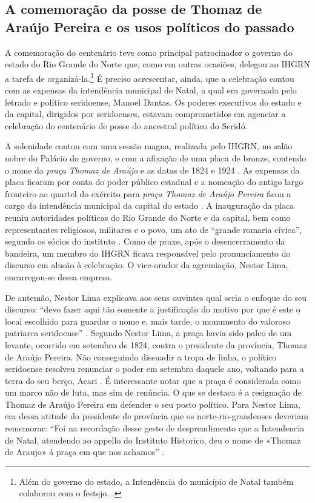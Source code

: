 \begin{refsection}
    \section{A comemoração da posse de Thomaz de Araújo Pereira e os usos políticos do passado}

    A comemoração do centenário teve como principal patrocinador o governo do estado do Rio Grande do Norte que, como em outras ocasiões, delegou ao IHGRN a tarefa de organizá-la.\footnote{Além do governo do estado, a Intendência do município de Natal também colaborou com o festejo. \cite[p.~172--173]{CentPosseTAPereira}.} É preciso acrescentar, ainda, que a celebração contou com as expensas da intendência municipal de Natal, a qual era governada pelo letrado e político seridoense, Manoel Dantas. Os poderes executivos do estado e da capital, dirigidos por seridoenses, estavam comprometidos em agenciar a celebração do centenário de posse do ancestral político do Seridó.  

    A solenidade contou com uma sessão magna, realizada pelo IHGRN, no salão nobre do Palácio do governo, e com a afixação de uma placa de bronze, contendo o nome da \textit{praça Thomaz de Araújo} e as datas de 1824 e 1924 \cite[p.~172--173]{CentPosseTAPereira}. As expensas da placa ficaram por conta do poder público estadual e a nomeação do antigo largo fronteiro ao quartel do exército para \textit{praça Thomaz de Araújo Pereira} ficou a cargo da intendência municipal da capital do estado \cite[p.~172--173]{CentPosseTAPereira}. A inauguração da placa reuniu autoridades políticas do Rio Grande do Norte e da capital, bem como representantes religiosos, militares e o povo, um ato de ``grande romaria cívica'', segundo os sócios do instituto \cite[p.~174]{CentPosseTAPereira}. Como de praxe, após o desencerramento da bandeira, um membro do IHGRN ficava responsável pelo pronunciamento do discurso em alusão à celebração. O vice-orador da agremiação, Nestor Lima, encarregou-se dessa empresa.  

    De antemão, Nestor Lima explicava aos seus ouvintes qual seria o enfoque do seu discurso: ``devo fazer aqui tão somente a justificação do motivo por que é este o local escolhido para guardar o nome e, mais tarde, o monumento do valoroso patriarca seridoense'' \cite[p.~194]{CentPosseTAPereira}. Segundo Nestor Lima, a praça havia sido palco de um levante, ocorrido em setembro de 1824, contra o presidente da província, Thomaz de Araújo Pereira. Não conseguindo dissuadir a tropa de linha, o político seridoense resolveu renunciar o poder em setembro daquele ano, voltando para a terra do seu berço, Acari \cite[p.~194]{CentPosseTAPereira}. É interessante notar que a praça é considerada como um marco não de luta, mas sim de renúncia. O que se destaca é a resignação de Thomaz de Araújo Pereira em defender o seu posto político. Para Nestor Lima, era dessa atitude do presidente de província que os norte-rio-grandenses deveriam rememorar: ``Foi na recordação desse gesto de desprendimento que a Intendencia de Natal, atendendo ao appello do Instituto Historico, deu o nome de «Thomaz de Araujo» á praça em que nos achamos'' \cite[p.~195]{CentPosseTAPereira}.


\end{refsection}
